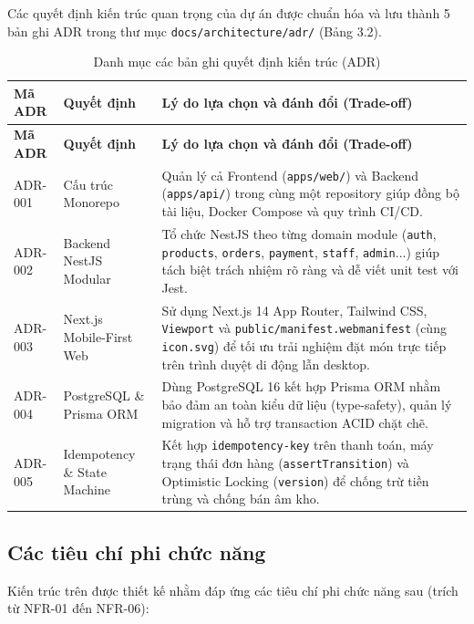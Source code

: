 \documentclass[12pt,a4paper]{report}
\begin{document}
Các quyết định kiến trúc quan trọng của dự án được chuẩn hóa và lưu thành 5 bản ghi ADR trong thư mục \texttt{docs/architecture/adr/} (Bảng 3.2).

\begin{longtable}{>{\centering\arraybackslash}p{1.8cm}>{\raggedright\arraybackslash}p{3.8cm}>{\raggedright\arraybackslash}p{9.4cm}}
\caption{Danh mục các bản ghi quyết định kiến trúc (ADR)}\\
\hline
\rowcolor{gray!20} \textbf{Mã ADR} & \textbf{Quyết định} & \textbf{Lý do lựa chọn và đánh đổi (Trade-off)} \\
\hline
\endfirsthead
\hline
\rowcolor{gray!20} \textbf{Mã ADR} & \textbf{Quyết định} & \textbf{Lý do lựa chọn và đánh đổi (Trade-off)} \\
\hline
\endhead
ADR-001 & Cấu trúc Monorepo & Quản lý cả Frontend (\texttt{apps/web/}) và Backend (\texttt{apps/api/}) trong cùng một repository giúp đồng bộ tài liệu, Docker Compose và quy trình CI/CD. \\
\hline
ADR-002 & Backend NestJS Modular & Tổ chức NestJS theo từng domain module (\texttt{auth}, \texttt{products}, \texttt{orders}, \texttt{payment}, \texttt{staff}, \texttt{admin}...) giúp tách biệt trách nhiệm rõ ràng và dễ viết unit test với Jest. \\
\hline
ADR-003 & Next.js Mobile-First Web & Sử dụng Next.js 14 App Router, Tailwind CSS, \texttt{Viewport} và \texttt{public/manifest.webmanifest} (cùng \texttt{icon.svg}) để tối ưu trải nghiệm đặt món trực tiếp trên trình duyệt di động lẫn desktop. \\
\hline
ADR-004 & PostgreSQL \& Prisma ORM & Dùng PostgreSQL 16 kết hợp Prisma ORM nhằm bảo đảm an toàn kiểu dữ liệu (type-safety), quản lý migration và hỗ trợ transaction ACID chặt chẽ. \\
\hline
ADR-005 & Idempotency \& State Machine & Kết hợp \texttt{idempotency-key} trên thanh toán, máy trạng thái đơn hàng (\texttt{assertTransition}) và Optimistic Locking (\texttt{version}) để chống trừ tiền trùng và chống bán âm kho. \\
\hline
\end{longtable}

\subsection{Các tiêu chí phi chức năng}

Kiến trúc trên được thiết kế nhằm đáp ứng các tiêu chí phi chức năng sau (trích từ NFR-01 đến NFR-06):
\end{document}
